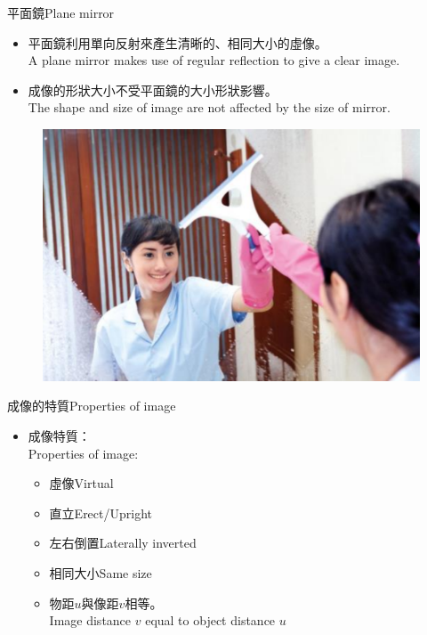 \documentclass[beamer=true]{standalone}
\begin{document}
\begin{frame}{平面鏡Plane mirror}
    \begin{itemize}
        \item 平面鏡利用單向反射來產生清晰的、相同大小的虛像。\\A plane mirror makes use of regular reflection to give a clear image.
        \item 成像的形狀大小不受平面鏡的大小形狀影響。\\The shape and size of image are not affected by the size of mirror.
    \end{itemize}
    \begin{figure}
        \centering
        \includegraphics[width=0.5\linewidth]{assets/djwoidjwqjdioqjwodijwqoi.png}
    \end{figure}
\end{frame}



\begin{frame}{成像的特質Properties of image}
    \begin{itemize}
        \item 成像特質：\\Properties of image:
        \begin{itemize}
            \item 虛像Virtual
            \item 直立Erect/Upright
            \item 左右倒置Laterally inverted
            \item 相同大小Same size
            \item 物距$u$與像距$v$相等。\\Image distance $v$ equal to object distance $u$
        \end{itemize}
    \end{itemize}
\end{frame}
\end{document}
